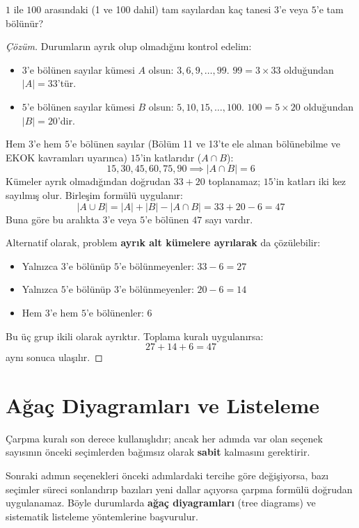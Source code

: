 \begin{example}
$1$ ile $100$ arasındaki (1 ve 100 dahil) tam sayılardan kaç tanesi $3$'e veya $5$'e tam bölünür?
\end{example}
\begin{proof}[Çözüm]
Durumların ayrık olup olmadığını kontrol edelim:
\begin{itemize}
  \item $3$'e bölünen sayılar kümesi $A$ olsun: $3, 6, 9, \dots, 99$. 
  $99 = 3 \times 33$ olduğundan $|A| = 33$'tür.
  \item $5$'e bölünen sayılar kümesi $B$ olsun: $5, 10, 15, \dots, 100$. 
  $100 = 5 \times 20$ olduğundan $|B| = 20$'dir.
\end{itemize}
Hem $3$'e hem $5$'e bölünen sayılar (Bölüm 11 ve 13'te ele alınan bölünebilme ve EKOK kavramları uyarınca) $15$'in katlarıdır ($A \cap B$):
\[ 15, 30, 45, 60, 75, 90 \implies |A \cap B| = 6 \]
Kümeler ayrık olmadığından doğrudan $33 + 20$ toplanamaz; $15$'in katları iki kez sayılmış olur. Birleşim formülü uygulanır:
\[ |A \cup B| = |A| + |B| - |A \cap B| = 33 + 20 - 6 = 47 \]
Buna göre bu aralıkta $3$'e veya $5$'e bölünen $47$ sayı vardır.

Alternatif olarak, problem \textbf{ayrık alt kümelere ayrılarak} da çözülebilir:
\begin{itemize}
  \item Yalnızca $3$'e bölünüp $5$'e bölünmeyenler: $33 - 6 = 27$
  \item Yalnızca $5$'e bölünüp $3$'e bölünmeyenler: $20 - 6 = 14$
  \item Hem $3$'e hem $5$'e bölünenler: $6$
\end{itemize}
Bu üç grup ikili olarak ayrıktır. Toplama kuralı uygulanırsa:
\[ 27 + 14 + 6 = 47 \]
aynı sonuca ulaşılır.
\end{proof}


\section{Ağaç Diyagramları ve Listeleme}

Çarpma kuralı son derece kullanışlıdır; ancak her adımda var olan seçenek sayısının önceki seçimlerden bağımsız olarak \textbf{sabit} kalmasını gerektirir. 

Sonraki adımın seçenekleri önceki adımlardaki tercihe göre değişiyorsa, bazı seçimler süreci sonlandırıp bazıları yeni dallar açıyorsa çarpma formülü doğrudan uygulanamaz. Böyle durumlarda \textbf{ağaç diyagramları} (tree diagrams) ve sistematik listeleme yöntemlerine başvurulur.

